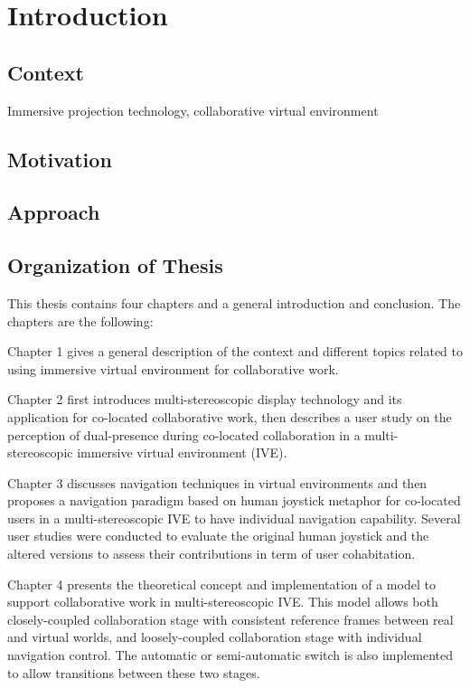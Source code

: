 \chapter*{Introduction}
\mtcaddchapter[Introduction]

\section*{Context}

Immersive projection technology, collaborative virtual environment

\section*{Motivation}

\section*{Approach}

\section*{Organization of Thesis}
This thesis contains four chapters and a general introduction and conclusion. The chapters are the following:

Chapter 1 gives a general description of the context and different topics related to using immersive virtual environment for collaborative work.

Chapter 2 first introduces multi-stereoscopic display technology and its application for co-located collaborative work, then describes a user study on the perception of dual-presence during co-located collaboration in a multi-stereoscopic immersive virtual environment (IVE).

Chapter 3 discusses navigation techniques in virtual environments and then proposes a navigation paradigm based on human joystick metaphor for co-located users in a multi-stereoscopic IVE to have individual navigation capability. Several user studies were conducted to evaluate the original human joystick and the altered versions to assess their contributions in term of user cohabitation.

Chapter 4 presents the theoretical concept and implementation of a model to support collaborative work in multi-stereoscopic IVE. This model allows both closely-coupled collaboration stage with consistent reference frames between real and virtual worlds, and loosely-coupled collaboration stage with individual navigation control. The automatic or semi-automatic switch is also implemented to allow transitions between these two stages.